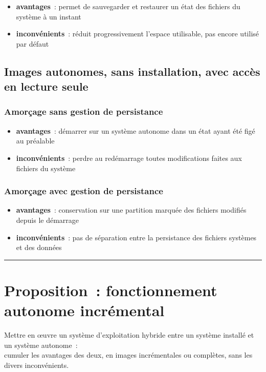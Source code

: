 \documentclass[10pt]{article}
\newcommand{\hr}{\rule{\textwidth}{1pt}}
\newenvironment{itmz}{\begin{itemize}
\setlength{\itemsep}{0em}
}{\end{itemize}}
\begin{document}
\begin{itmz}
\item{\textbf{avantages} : permet de sauvegarder et restaurer un état des fichiers du système à un instant}
\item{\textbf{inconvénients} : réduit progressivement l’espace utilisable, pas encore utilisé par défaut}
\end{itmz}

\subsection{Images autonomes, sans installation, avec accès en lecture seule}

\subsubsection{Amorçage sans gestion de persistance}

\begin{itmz}
\item{\textbf{avantages} : démarrer sur un système autonome dans un état ayant été figé au préalable}
\item{\textbf{inconvénients} : perdre au redémarrage toutes modifications faites aux fichiers du système}
\end{itmz}

\subsubsection{Amorçage avec gestion de persistance}

\begin{itmz}
\item{\textbf{avantages} : conservation sur une partition marquée des fichiers modifiés depuis le démarrage}
\item{\textbf{inconvénients} : pas de séparation entre la persistance des fichiers systèmes et des données}
\end{itmz}

\hr

\section{Proposition : fonctionnement autonome incrémental}

Mettre en œuvre un système d’exploitation hybride entre un système installé et un système autonome :\\
cumuler les avantages des deux, en images incrémentales ou complètes, sans les divers inconvénients.
\end{document}

